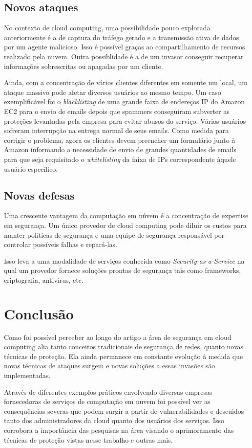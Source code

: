 \documentclass[brazil,12pt]{article}
\begin{document}
\subsection{Novos ataques}
No contexto de cloud computing, uma possibilidade pouco explorada anteriormente
é a de captura do tráfego gerado e a transmissão ativa de dados por um agente
malicioso. Isso é possível graças ao compartilhamento de recursos realizado pela
nuvem. Outra possiblidade é a de um invasor conseguir recuperar informações
sobrescritas ou apagadas por um cliente.

Ainda, com a concentração de vários clientes diferentes em somente um local, um
ataque massivo pode afetar diversos usuários ao mesmo tempo. Um caso
exemplificável foi o \emph{blacklisting} de uma grande faixa de endereços IP do
Amazon EC2 para o envio de emails depois que spammers conseguiram subverter as
proteções levantadas pela empresa para evitar abusos do serviço. Vários usuários
sofreram interrupção na entrega normal de seus emails. Como medida para corrigir
o problema, agora os clientes devem preencher um formulário junto à Amazon
informando a necessidade de envio de grandes quantidades de emails para que seja
requisitado o \emph{whitelisting} da faixa de IPs correspondente àquele usuário
específico.

\subsection{Novas defesas}
Uma crescente vantagem da computação em núvem é a concentração de
expertise em segurança. Um único provedor de cloud computing pode diluir os
custos para manter políticas de segurança e uma equipe de segurança responsável
por controlar possíveis falhas e repará-las.

Isso leva a uma modalidade de serviços conhecida como
\emph{Security-as-a-Service} na qual um provedor fornece soluções prontas de
segurança tais como frameworks, criptografia, antivírus, etc.

\section{Conclusão}
Como foi possível perceber ao longo do artigo a área de segurança em cloud
computing alia tanto conceitos tradicionais de segurança de redes, quanto novas
técnicas de proteção. Ela ainda permanece em constante evolução à medida que
novas técnicas de ataques surgem e novas soluções a essas invasões são
implementadas.

Através de diferentes exemplos práticos envolvendo diversas empresas
fornecedoras de serviços de computação em nuvem foi possível ver as
consequências severas que podem surgir a partir de vulnerabilidades e descuidos
tanto dos administradores da cloud quanto dos usuários dos serviços. Isso
corrobora a importância das pesquisas na área visando o aprimoramento das
técnicas de proteção vistas nesse trabalho e outras mais.

\nocite{*}


\end{document}

